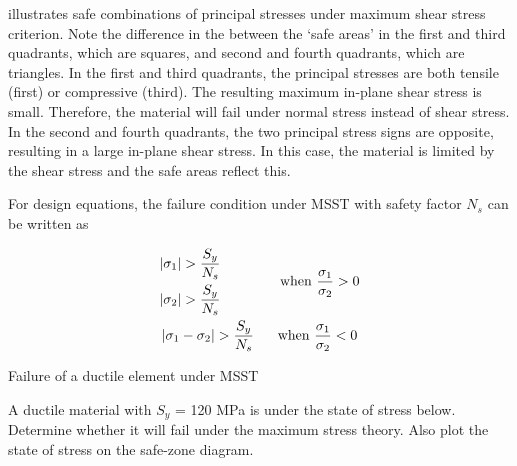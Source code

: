 \documentclass[
10pt,
a4paper,
openany,
svgnames,
]{book}
\begin{document}
 illustrates safe combinations of principal stresses under maximum shear stress criterion. Note the difference in the between the ‘safe areas’ in the first and third quadrants, which are squares, and second and fourth quadrants, which are triangles. In the first and third quadrants, the principal stresses are both tensile (first) or compressive (third). The resulting maximum in-plane shear stress is small. Therefore, the material will fail under normal stress instead of shear stress. In the second and fourth quadrants, the two principal stress signs are opposite, resulting in a large in-plane shear stress. In this case, the material is limited by the shear stress and the safe areas reflect this.

For design equations, the failure condition under MSST with safety factor $N_s$ can be written as

\begin{equation}
  \begin{gathered}
    \begin{gathered}
        \left| \sigma_1 \right| > \frac{S_y}{N_s} \\
        \left| \sigma_2 \right| > \frac{S_y}{N_s}  \\ 
      \end{gathered}  \hspace{1.5cm} \text{when } \dfrac{\sigma _1}{\sigma _2} > 0 \\
      \left| {\sigma _1} - {\sigma _2} \right| > \frac{S_y}{N_s} \hspace{0.6cm} \text{when } \dfrac{\sigma_1}{\sigma_2} < 0
  \end{gathered}
\end{equation}

\begin{example} Failure of a ductile element under MSST

  A ductile material with $S_y$ = 120 MPa is under the state of stress below. Determine whether it will fail under the maximum stress theory. Also plot the state of stress on the safe-zone diagram.
  \begin{figure}[H]
    \centering
  \end{figure} 
\end{example}
\end{document}
